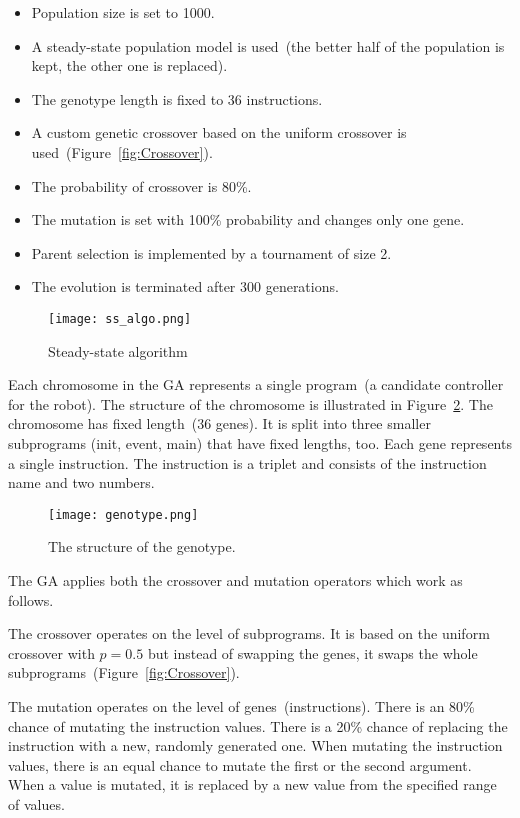 \documentclass{ExcelAtFIT}
\begin{document}
\begin{itemize}
	\item Population size is set to 1000.
	\item A steady-state population model is used~(the better half of the population is kept, the other one is replaced).
	\item The genotype length is fixed to 36 instructions.
	\item A custom genetic crossover based on the uniform crossover is used~(Figure~\ref{fig:Crossover}).
	\item The probability of crossover is 80\%.
	\item The mutation is set with 100\% probability and changes only one gene.
	\item Parent selection is implemented by a tournament of size 2.
	\item The evolution is terminated after 300 generations.
\end{itemize}

\begin{figure}[h]
	\centering
	{\texttt{[image: ss\_algo.png]}}
	\caption{
	Steady-state algorithm
	}
	\label{fig:SteadyStateAlgorithm}
\end{figure}

Each chromosome in the GA represents a single program~(a candidate controller for the robot).
The structure of the chromosome is illustrated in Figure~\ref{fig:Genotype}.
The chromosome has fixed length~(36 genes).
It is split into three smaller subprograms (init, event, main) that have fixed lengths, too.
Each gene represents a single instruction.
The instruction is a triplet and consists of the instruction name and two numbers.

\begin{figure}[h]
	\centering
	{\texttt{[image: genotype.png]}}
	\caption{
		The structure of the genotype.
	}
	\label{fig:Genotype}
\end{figure}



The GA applies both the crossover and mutation operators which work as follows.

The crossover operates on the level of subprograms.
It is based on the uniform crossover with $p = 0.5$ but instead of swapping the genes, it swaps the whole subprograms~(Figure~\ref{fig:Crossover}).

The mutation operates on the level of genes~(instructions).
There is an 80\% chance of mutating the instruction values.
There is a 20\% chance of replacing the instruction with a new, randomly generated one.
When mutating the instruction values, there is an equal chance to mutate the first or the second argument.
When a value is mutated, it is replaced by a new value from the specified range of values.
\end{document}
